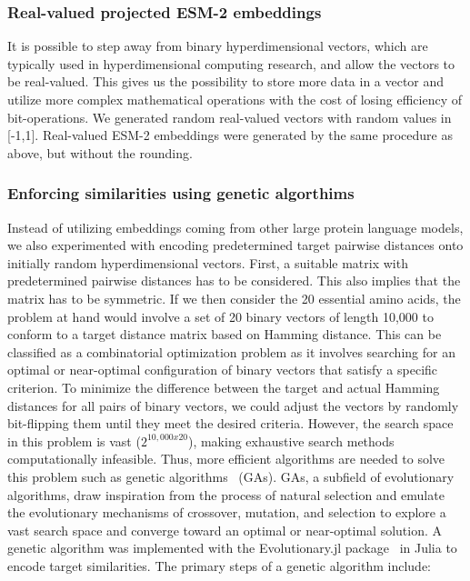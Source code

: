 \subsubsection*{Real-valued projected ESM-2 embeddings}
It is possible to step away from binary hyperdimensional vectors, which are typically used in hyperdimensional computing research, and allow the vectors to be real-valued. This gives us the possibility to store more data in a vector and utilize more complex mathematical operations with the cost of losing efficiency of bit-operations. We generated random real-valued vectors with random values in [-1,1]. Real-valued ESM-2 embeddings were generated by the same procedure as above, but without the rounding.
\subsubsection*{Enforcing similarities using genetic algorthims}
Instead of utilizing embeddings coming from other large protein language models, we also experimented with encoding predetermined target pairwise distances onto initially random hyperdimensional vectors. First, a suitable matrix with predetermined pairwise distances has to be considered. This also implies that the matrix has to be symmetric. If we then consider the 20 essential amino acids, the problem at hand would involve a set of 20 binary vectors of length 10,000 to conform to a target distance matrix based on Hamming distance. This can be classified as a combinatorial optimization problem as it involves searching for an optimal or near-optimal configuration of binary vectors that satisfy a specific criterion. To minimize the difference between the target and actual Hamming distances for all pairs of binary vectors, we could adjust the vectors by randomly bit-flipping them until they meet the desired criteria. However, the search space in this problem is vast ($2^{10,000 x 20}$), making exhaustive search methods computationally infeasible. Thus, more efficient algorithms are needed to solve this problem such as genetic algorithms~\cite{GA} (GAs). GAs, a subfield of evolutionary algorithms, draw inspiration from the process of natural selection and emulate the evolutionary mechanisms of crossover, mutation, and selection to explore a vast search space and converge toward an optimal or near-optimal solution. A genetic algorithm was implemented with the Evolutionary.jl package~\cite{evojl} in Julia to encode target similarities. The primary steps of a genetic algorithm include:
